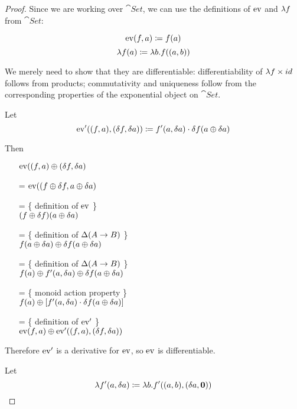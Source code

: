 \begin{proof}
  Since we are working over $\cat{Set}$, we can use the definitions of $\operatorname{ev}$ and
  $\lambda f$ from $\cat{Set}$:

  $$\operatorname{ev}(f, a) \coloneqq f(a)$$
  $$\lambda f(a) \coloneqq \lambda b. f((a, b))$$
  
  We merely need to show that they are differentiable: differentiability of $\lambda f
  \times id$ follows from products; commutativity and
  uniqueness follow from the corresponding properties of the exponential object
  on $\cat{Set}$.

  Let 
  $$\operatorname{ev}'((f, a), (\delta f, \delta a)) \coloneqq f'(a, \delta a) \cdot \delta f(a \oplus \delta a)$$

  Then
  \begin{itemize}
    \item[ ]$\operatorname{ev}((f, a) \oplus (\delta f, \delta a)$
    \item[=]$\operatorname{ev}((f \oplus \delta f, a \oplus \delta a)$
    \item[=]\{ definition of $\operatorname{ev}$ \}\\
      $(f \oplus \delta f)(a \oplus \delta a)$
    \item[=]\{ definition of $\Delta (A \rightarrow B)$ \}\\
      $f(a \oplus \delta a) \oplus \delta f(a \oplus \delta a)$
    \item[=]\{ definition of $\Delta (A \rightarrow B)$ \}\\
      $f(a) \oplus f'(a, \delta a) \oplus \delta f(a \oplus \delta a)$
    \item[=]\{ monoid action property \}\\
      $f(a) \oplus \left[ f'(a, \delta a) \cdot \delta f(a \oplus \delta a)\right]$
    \item[=]\{ definition of $\operatorname{ev}'$ \}\\
      $\operatorname{ev}(f, a) \oplus \operatorname{ev}'((f, a), (\delta f, \delta a))$
  \end{itemize}
  Therefore $\operatorname{ev}'$ is a derivative for $\operatorname{ev}$, so $\operatorname{ev}$ is differentiable.
  
  Let
  $$\lambda f'(a, \delta a) \coloneqq \lambda b. f'((a, b),
  (\delta a, \textbf{0}))$$
  

\end{proof}
